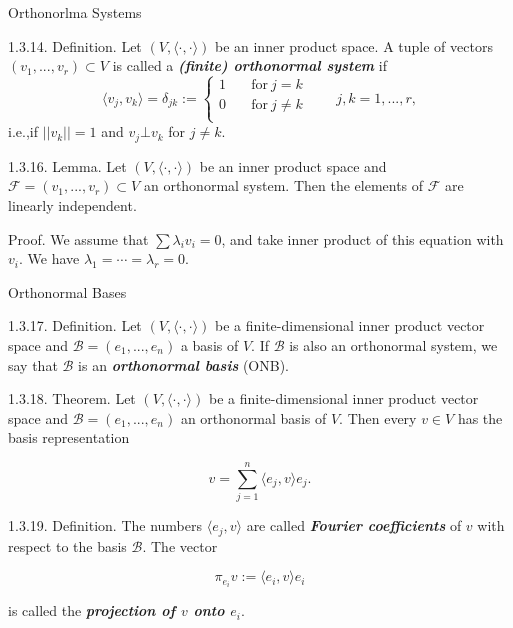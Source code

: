 \documentclass[hyperref={pdfpagelabels=true}]{beamer}
\newcommand{\highlightg}[1]{\textcolor[rgb]{0.1,0.5,0.3}{\emph{\textbf{#1}}}}
\newcommand{\<}{\langle}
\renewcommand{\>}{\rangle}
\begin{document}
\begin{frame}{Orthonorlma Systems}
    \begin{block}{1.3.14. Definition.}
        Let $(V,\<\cdot,\cdot\>)$ be an inner product space. A tuple of vectors $(v_{1},...,v_{r}) \subset V$ is called a \highlightg{(finite) orthonormal system} if 
        \[
            \<v_{j},v_{k}\> = \delta_{jk} :=
            \left\{
                \begin{aligned}
                    1 &\quad \text{for}\ j = k \\
                    0 &\quad \text{for}\ j \neq k \\
                \end{aligned}
            \right.
            \qquad j,k = 1,...,r,
        \] 
        i.e.,if $||v_{k}|| = 1$ and $v_{j} \bot v_{k}$ for $j \neq k$.
    \end{block}
    \begin{block}{1.3.16. Lemma.}
        Let $(V,\<\cdot,\cdot\>)$ be an inner product space and $\mathcal{F} = (v_{1},...,v_{r}) \subset V$ an orthonormal system. Then the elements of $\mathcal{F}$ are linearly independent.
    \end{block}
    \begin{block}{Proof.}
        We assume that $\sum \lambda_{i}v_{i} = 0$, and take inner product of this equation with $v_{i}$. We have $\lambda_{1} = \cdots = \lambda_{r} = 0$.
    \end{block}
\end{frame}
\begin{frame}{Orthonormal Bases}
    \begin{block}{1.3.17. Definition.}
        Let $(V,\<\cdot,\cdot\>)$ be a finite-dimensional inner product vector space and $\mathcal{B} = (e_{1},...,e_{n})$ a basis of $V$. If $\mathcal{B}$ is also an orthonormal system, we say that $\mathcal{B}$ is an \highlightg{orthonormal basis} (ONB).
    \end{block}
    \begin{block}{1.3.18. Theorem.}
        Let $(V,\<\cdot,\cdot\>)$ be a finite-dimensional inner product vector space and $\mathcal{B} = (e_{1},...,e_{n})$ an orthonormal basis of $V$. Then every $v \in V$ has the basis representation
        \begin{spacing}{0.5}
        \[v = \sum_{j = 1}^{n}\<e_{j},v\>e_{j}.\]
        \end{spacing}
    \end{block}
    \begin{block}{1.3.19. Definition.}
        The numbers $\<e_{j},v\>$ are called \highlightg{Fourier coefficients} of $v$ with respect to the basis $\mathcal{B}$. The vector 
        \begin{spacing}{0.7}
        \[\pi_{e_{i}}v:=\<e_{i},v\>e_{i}\]
        \end{spacing}
        is called the \highlightg{projection of $v$ onto $e_{i}$}.
    \end{block}
\end{frame}
\end{document}
